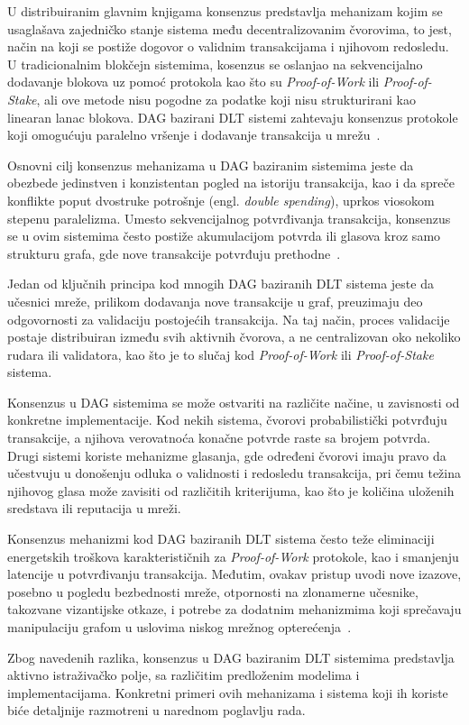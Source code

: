 U distribuiranim glavnim knjigama konsenzus predstavlja mehanizam kojim se usaglašava zajedničko stanje sistema među decentralizovanim čvorovima, to jest, način na koji se postiže dogovor o validnim transakcijama i njihovom redosledu. U tradicionalnim blokčejn sistemima, kosenzus se oslanjao na sekvencijalno dodavanje blokova uz pomoć protokola kao što su \textit{Proof-of-Work} ili \textit{Proof-of-Stake}, ali ove metode nisu pogodne za podatke koji nisu strukturirani kao linearan lanac blokova. DAG bazirani DLT sistemi zahtevaju konsenzus protokole koji omogućuju paralelno vršenje i dodavanje transakcija u mrežu~\cite{blockeden DAG}. %

Osnovni cilj konsenzus mehanizama u DAG baziranim sistemima jeste da obezbede jedinstven i konzistentan pogled na istoriju transakcija, kao i da spreče konflikte poput dvostruke potrošnje (engl. \textit{double spending}), uprkos viosokom stepenu paralelizma. Umesto sekvencijalnog potvrđivanja transakcija, konsenzus se u ovim sistemima često postiže akumulacijom potvrda ili glasova kroz samo strukturu grafa, gde nove transakcije potvrđuju prethodne~\cite{DAG in Smart Mobility}.

Jedan od ključnih principa kod mnogih DAG baziranih DLT sistema jeste da učesnici mreže, prilikom dodavanja nove transakcije u graf, preuzimaju deo odgovornosti za validaciju postojećih transakcija. Na taj način, proces validacije postaje distribuiran između svih aktivnih čvorova, a ne centralizovan oko nekoliko rudara ili validatora, kao što je to slučaj kod \textit{Proof-of-Work} ili \textit{Proof-of-Stake} sistema.

Konsenzus u DAG sistemima se može ostvariti na različite načine, u zavisnosti od konkretne implementacije. Kod nekih sistema, čvorovi probabilistički potvrđuju transakcije, a njihova verovatnoća konačne potvrde raste sa brojem potvrda. Drugi sistemi koriste mehanizme glasanja, gde određeni čvorovi imaju pravo da učestvuju u donošenju odluka o validnosti i redosledu transakcija, pri čemu težina njihovog glasa može zavisiti od različitih kriterijuma, kao što je količina uloženih sredstava ili reputacija u mreži.

Konsenzus mehanizmi kod DAG baziranih DLT sistema često teže eliminaciji energetskih troškova karakterističnih za \textit{Proof-of-Work} protokole, kao i smanjenju latencije u potvrđivanju transakcija. Međutim, ovakav pristup uvodi nove izazove, posebno u pogledu bezbednosti mreže, otpornosti na zlonamerne učesnike, takozvane vizantijske otkaze, i potrebe za dodatnim mehanizmima koji sprečavaju manipulaciju grafom u uslovima niskog mrežnog opterećenja~\cite{DAG in Smart Mobility}.

Zbog navedenih razlika, konsenzus u DAG baziranim DLT sistemima predstavlja aktivno istraživačko polje, sa različitim predloženim modelima i implementacijama. Konkretni primeri ovih mehanizama i sistema koji ih koriste biće detaljnije razmotreni u narednom poglavlju rada.